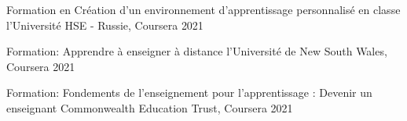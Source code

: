 

\begin{cvhonors}

    


            \cvhonor
        { Formation en Création d'un environnement d'apprentissage personnalisé en classe
        } %
        {l'Université HSE - Russie, Coursera} %
    {} %
    {2021} %
%     
    
     \cvhonor
        {Formation: Apprendre à enseigner à distance 
        } %
  {l'Université de New South Wales, Coursera} %
    {} %
    {2021} %
  

     \cvhonor
{Formation: Fondements de l'enseignement pour l'apprentissage : Devenir un enseignant
} %
{Commonwealth Education Trust, Coursera} %
{} %
{2021} %
\end{cvhonors}